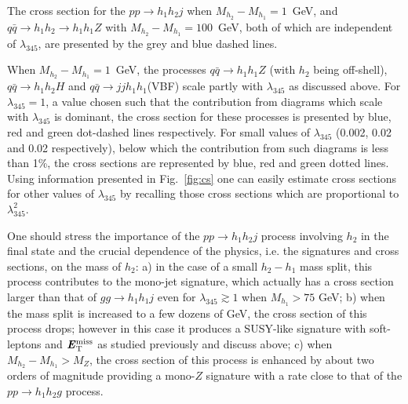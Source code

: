 \documentclass[12pt,a4paper]{article}
\newcommand {\blue} {\color{blue}}
\newcommand{\MET}{\textbf{\textit{E}$_{\rm T}^{\rm miss}$}}
\newcommand{\giac}[2]{{\blue #1 #2}}
\begin{document}
The cross section for the  $pp \to h_1 h_2 j$ when $M_{h_2}-M_{h_1}=1$~GeV,
and $q\bar{q}\to h_1 h_2 \to h_1 h_1 Z$ with $M_{h_2}-M_{h_1}=100$~GeV, both of which are
independent of $\lambda_{345}$, are presented by the grey and blue dashed lines.

When $M_{h_2}-M_{h_1}=1$~GeV, the processes $q\bar{q}\to h_1 h_1 Z$ (with $h_2$ being off-shell), $q\bar{q}\to h_1 h_2 H$
and $q\bar{q}\to  j j h_1 h_1$(VBF) scale partly with $\lambda_{345}$ as discussed above.
For $\lambda_{345}=1$, a value chosen such that
the contribution from diagrams which scale with $\lambda_{345}$
is dominant, the cross section for these processes is presented 
by blue, red and green dot-dashed lines respectively.
For small values of $\lambda_{345}$ (0.002, 0.02 and 0.02 respectively), below which 
the contribution from such diagrams is less than 1\%, the cross sections are
represented by blue, red and green dotted lines.
%
Using information presented in Fig.~\ref{fig:cs}
one can easily estimate cross sections for other values of  $\lambda_{345}$ by
recalling those  cross sections which are proportional to  $\lambda_{345}^2$.

One should  stress the importance of the  $pp\to h_1 h_2j$  process 
involving $h_2$ in the final state
and the crucial dependence of the physics, i.e. the signatures and cross sections, on the mass of $h_2$:
a) in the case of a small $h_2-h_1$ mass split, this process
contributes to the mono-jet signature, which actually has a 
cross section larger than that of  $gg\to  h_1 h_1 j$
even for  $\lambda_{345}\gtrsim 1$ when $M_{h_1}> 75$ GeV;
b) when the mass split is increased to a few dozens of GeV,
the cross section of this process drops; however in this case it
produces a SUSY-like signature with soft-leptons and $\MET{}$ as studied previously and discuss above;
c) when $M_{h_2}-M_{h_1} > M_Z$,
the cross section of this process is enhanced by about two orders of magnitude
providing a mono-$Z$ signature with a rate close to that of the $pp\to h_1 h_2g$ 
process.



\end{document}
